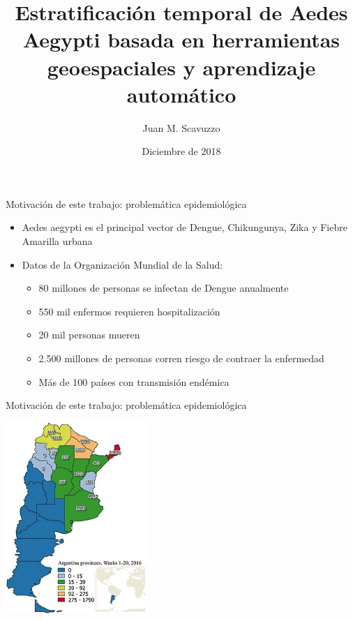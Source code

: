 \documentclass[10pt]{beamer}
\title{Estratificación temporal de Aedes Aegypti basada en herramientas geoespaciales y aprendizaje automático}
\date{Diciembre de 2018}
\author{Juan M. Scavuzzo}
\institute{Facultad de Matemática, Astronomía, Física y Computación \\ Universidad Nacional de Córdoba}
\begin{document}
\maketitle



\begin{frame}{Motivación de este trabajo: problemática epidemiológica}
  \begin{itemize}[<+->]
   \item Aedes aegypti es el principal vector de Dengue, Chikungunya, Zika
         y Fiebre Amarilla urbana
   \item Datos de la Organización Mundial de la Salud:
    \begin{itemize}[<+->]
      \item 80 millones de personas se infectan de Dengue anualmente
      \item 550 mil enfermos requieren hospitalización
      \item 20 mil personas mueren
      \item 2.500 millones de personas corren riesgo de contraer la enfermedad
      \item Más de 100 países con transmisión endémica
    \end{itemize}
  \end{itemize}
\end{frame}



\begin{frame}{Motivación de este trabajo: problemática epidemiológica}

  \begin{center}
    \includegraphics[width=0.4\textwidth]{dengue}
  \end{center}

\end{frame}
\end{document}

